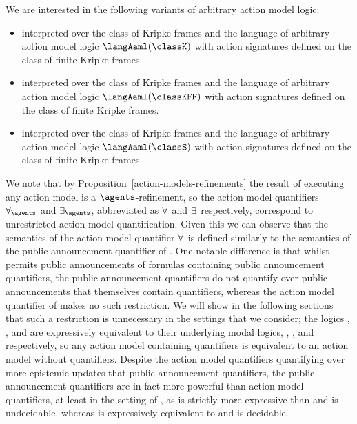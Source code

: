 We are interested in the following variants of arbitrary action model logic:
\begin{itemize}
    \item \logicAamlK{} interpreted over the class of \classK{} Kripke frames and the language of arbitrary action model logic $\langAaml(\classK)$ with action signatures defined on the class of finite \classK{} Kripke frames.
    \item \logicAamlKFF{} interpreted over the class of \classKFF{} Kripke frames and the language of arbitrary action model logic $\langAaml(\classKFF)$ with action signatures defined on the class of finite \classKFF{} Kripke frames.
    \item \logicAamlS{} interpreted over the class of \classS{} Kripke frames and the language of arbitrary action model logic $\langAaml(\classS)$ with action signatures defined on the class of finite \classS{} Kripke frames.
\end{itemize}

We note that by Proposition~\ref{action-models-refinements} the result of executing any action model is a $\agents$-refinement, so the action model quantifiers $\allactsAs$ and $\someactsAs$, abbreviated as $\allacts$ and $\someacts$ respectively, correspond to unrestricted action model quantification.
Given this we can observe that the semantics of the action model quantifier $\allacts$ is defined similarly to the semantics of the public announcement quantifier of \logicApal{}.
One notable difference is that whilst \logicApal{} permits public announcements of formulas containing public announcement quantifiers, the public announcement quantifiers do not quantify over public announcements that themselves contain quantifiers, whereas the action model quantifier of \logicAaml{} makes no such restriction.
We will show in the following sections that such a restriction is unnecessary in the settings that we consider; the logics \logicAamlK{}, \logicAamlKFF{}, and \logicAamlS{} are expressively equivalent to their underlying modal logics, \logicK{}, \logicKFF{}, and \logicS{} respectively, so any action model containing quantifiers is equivalent to an action model without quantifiers.
Despite the action model quantifiers quantifying over more epistemic updates that public announcement quantifiers, the public announcement quantifiers are in fact more powerful than action model quantifiers, at least in the setting of \classS{}, as \logicApalS{} is strictly more expressive than \logicS{} and is undecidable, whereas \logicAamlS{} is expressively equivalent to \logicS{} and is decidable.

